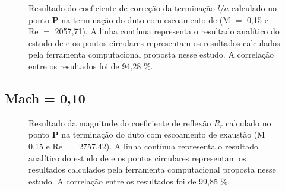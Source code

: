 \newpage
\begin{figure}[ht!]
\centering
  \caption[Coeficiente de Correção da Terminação $l/a$ com Escoamento de Exaustão (M $=$ 0,15)]{Resultado do coeficiente de correção da terminação $l/a$ calculado no ponto $\textbf{P}$ na terminação do duto com escoamento de (M $=$ 0,15 e Re $=$ 2057,71). A linha contínua representa o resultado analítico do estudo de  e os pontos circulares representam os resultados calculados pela ferramenta computacional proposta nesse estudo. A correlação entre os resultados foi de 94,28 \%.}
  \label{fig:loa_boca_015}
\end{figure}

\newpage
\subsection{Mach = 0,10}

\begin{figure}[ht!]
\centering
  \caption[Coeficiente de Reflexão $R_{r}$ com Escoamento de Exaustão (M $=$ 0,15)]{Resultado da magnitude do coeficiente de reflexão $R_{r}$ calculado no ponto $\textbf{P}$ na terminação do duto com escoamento de exaustão (M $=$ 0,15 e Re $=$ 2757,42). A linha contínua representa o resultado analítico do estudo de  e os pontos circulares representam os resultados calculados pela ferramenta computacional proposta nesse estudo. A correlação entre os resultados foi de 99,85 \%.}
  \label{fig:abs_r_boca_010}
\end{figure}

